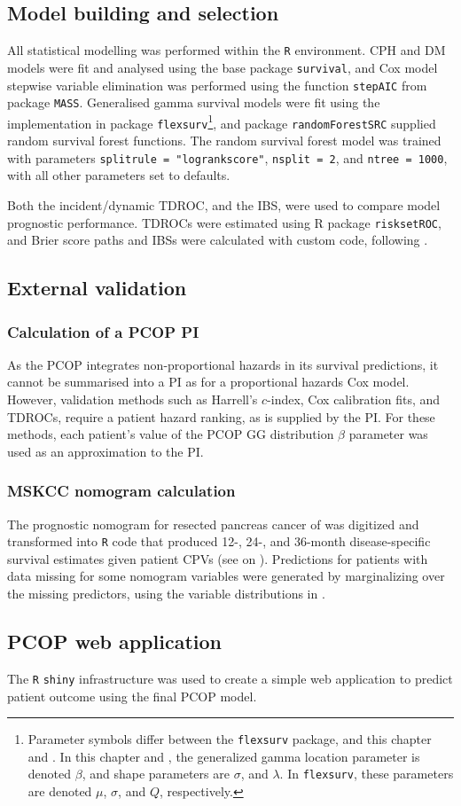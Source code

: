 \documentclass[dissertation.tex]{subfiles}
\begin{document}
\subsection{Model building and selection}
All statistical modelling was performed within the \texttt{R} environment.  \gls{CPH} and \gls{DM} models were fit and analysed using the base package \texttt{survival}, and Cox model stepwise variable elimination was performed using the function \texttt{stepAIC} from package \texttt{MASS}.  Generalised gamma survival models were fit using the implementation in package \texttt{flexsurv}\footnote{Parameter symbols differ between the \texttt{flexsurv} package, and this chapter and \cite{Cox2007}.  In this chapter and \cite{Cox2007}, the generalized gamma location parameter is denoted $\beta$, and shape parameters are $\sigma$, and $\lambda$.  In \texttt{flexsurv}, these parameters are denoted $\mu$, $\sigma$, and $Q$, respectively.}, and package \texttt{randomForestSRC} supplied random survival forest functions.  The random survival forest model was trained with parameters \texttt{splitrule = "logrankscore"}, \texttt{nsplit = 2}, and \texttt{ntree = 1000}, with all other parameters set to defaults.

Both the incident/dynamic \gls{TDROC}, and the \gls{IBS}, were used to compare model prognostic performance.  \glspl{TDROC} were estimated using R package \texttt{risksetROC}, and Brier score paths and \glspl{IBS} were calculated with custom code, following \cite{Graf1999}.


\subsection{External validation}
\subsubsection{Calculation of a \acrshort{PCOP} \acrlong{PI}}
As the \gls{PCOP} integrates non-proportional hazards in its survival predictions, it cannot be summarised into a \gls{PI} as for a proportional hazards Cox model.  However, validation methods such as Harrell's $c$-index, Cox calibration fits, and \glspl{TDROC}, require a patient hazard ranking, as is supplied by the \gls{PI}.  For these methods, each patient's value of the \gls{PCOP} \gls{GG} distribution $\beta$ parameter was used as an approximation to the \gls{PI}.

\subsubsection{MSKCC nomogram calculation}
The prognostic nomogram for resected pancreas cancer of \cite{Brennan2004} was digitized and transformed into \texttt{R} code that produced 12-, 24-, and 36-month disease-specific survival estimates given patient \glspl{CPV} (see  on ).  Predictions for patients with data missing for some nomogram variables were generated by marginalizing over the missing predictors, using the variable distributions in \cite{Brennan2004}.

\subsection{PCOP web application}
The \texttt{R} \texttt{shiny} infrastructure was used to create a simple web application to predict patient outcome using the final \gls{PCOP} model.
\end{document}

